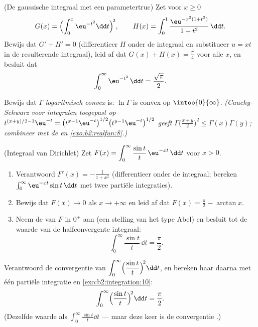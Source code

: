 \begin{exercise}[$\star\star\star$]\label{exo:b2:integration:8}
(De gaussische integraal met een parametertruc) Zet voor $x \geq 0$
\[
G(x) = \Bigl(\int_0^x \eu^{-t^2}\dd t\Bigr)^{\!2},
\qquad
H(x) = \int_0^1 \frac{\eu^{-x^2(1+t^2)}}{1 + t^2}\,\dd t .
\]
Bewijs dat $G' + H' = 0$ (differentieer $H$ onder de integraal en
substitueer $u = xt$ in de resulterende integraal), leid af dat
$G(x) + H(x) = \frac\pi4$ voor alle $x$, en besluit dat
\[
\int_0^{\infty} \eu^{-t^2}\,\dd t = \frac{\sqrt\pi}{2} .
\]
\end{exercise}

\begin{exercise}[$\star\star\star$]\label{exo:b2:integration:9}
Bewijs dat $\Gamma$ \emph{logaritmisch convex} is: $\ln\Gamma$ is
convex op $\intoo{0}{\infty}$. \emph{(Cauchy--Schwarz voor
integralen toegepast op $t^{(x+y)/2 - 1}\eu^{-t} =
\bigl(t^{x-1}\eu^{-t}\bigr)^{1/2} \bigl(t^{y-1}\eu^{-t}\bigr)^{1/2}$
geeft $\Gamma\bigl(\frac{x+y}{2}\bigr)^2 \leq \Gamma(x)\Gamma(y)$;
combineer met de  en \cref{exo:b2:realfun:8}.)}
\end{exercise}

\begin{exercise}[$\star\star\star$]\label{exo:b2:integration:10}
(Integraal van Dirichlet) Zet $F(x) = \displaystyle\int_0^{\infty}
\frac{\sin t}{t}\,\eu^{-xt}\,\dd t$ voor $x > 0$.
\begin{enumerate}
  \item Verantwoord $F'(x) = -\frac{1}{1 + x^2}$ (differentieer
        onder de integraal; bereken $\int_0^\infty \eu^{-xt}\sin
        t\,\dd t$ met twee partiële integraties).
  \item Bewijs dat $F(x) \to 0$ als $x \to +\infty$ en leid af dat
        $F(x) = \frac\pi2 - \arctan x$.
  \item Neem de  van $F$ in $0^+$ aan (een stelling van
        het type Abel) en besluit tot de waarde van de
        halfconvergente integraal:
        \[
        \int_0^{\infty} \frac{\sin t}{t}\,\dd t = \frac{\pi}{2}.
        \]
\end{enumerate}
\end{exercise}

\begin{exercise}[$\star\star$]\label{exo:b2:integration:11}
Verantwoord de convergentie van $\displaystyle\int_0^\infty
\Bigl(\frac{\sin t}{t}\Bigr)^{\!2}\dd t$, en bereken haar daarna
met één partiële integratie en \cref{exo:b2:integration:10}:
\[
\int_0^\infty \Bigl(\frac{\sin t}{t}\Bigr)^{\!2}\dd t
= \frac{\pi}{2} .
\]
(Dezelfde waarde als $\int_0^\infty \frac{\sin t}{t}\dd t$ --- maar
deze keer is de convergentie .)
\end{exercise}

